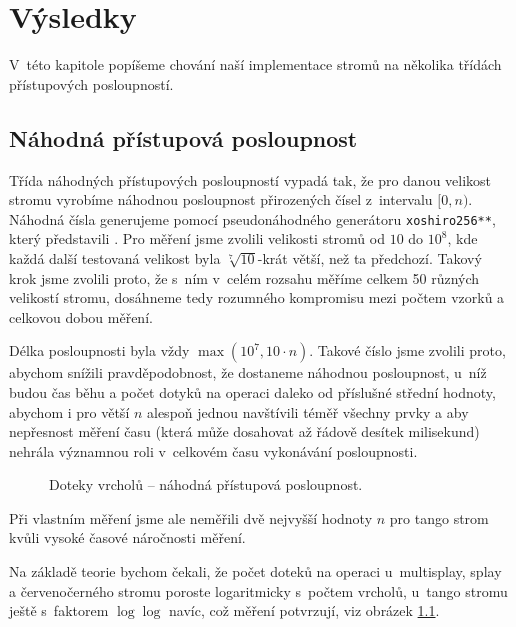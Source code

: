 \chapter{Výsledky}

V~této kapitole popíšeme chování naší implementace stromů na několika třídách přístupových posloupností.

\section{Náhodná přístupová posloupnost}

Třída náhodných přístupových posloupností vypadá tak, že pro danou velikost
stromu vyrobíme náhodnou posloupnost přirozených čísel z~intervalu $[0,n)$.
Náhodná čísla generujeme pomocí pseudonáhodného generátoru {\tt xoshiro256**},
který představili \citet{xoshiro}. Pro měření jsme zvolili velikosti stromů od $10$ do $
10^8$, kde každá další testovaná velikost byla $\sqrt[7]{10}$-krát větší, než ta předchozí. Takový krok
jsme zvolili proto, že s~ním v~celém rozsahu měříme celkem 50 různých velikostí
stromu, dosáhneme tedy rozumného kompromisu mezi počtem vzorků a celkovou
dobou měření. 

Délka posloupnosti byla vždy $\max(10^7, 10\cdot n)$.
Takové číslo jsme zvolili proto, abychom snížili pravděpodobnost, že dostaneme
náhodnou posloupnost, u~níž budou čas běhu a počet dotyků na operaci daleko od
příslušné střední hodnoty, abychom i pro větší $n$ alespoň jednou navštívili
téměř všechny prvky a aby
nepřesnost měření času (která může dosahovat až řádově desítek milisekund)
nehrála významnou roli v~celkovém času vykonávání posloupnosti. 

\def\graphfigure#1#2{
\begin{figure}[h!]
\centering
\caption{#2}
\label{obr:#1}
\end{figure}
}

\graphfigure{touch_r}{Doteky vrcholů -- náhodná přístupová posloupnost.}


Při vlastním měření jsme ale neměřili dvě nejvyšší hodnoty $n$ pro tango strom kvůli vysoké časové náročnosti měření.

Na základě teorie bychom čekali, že počet doteků na operaci u~multisplay, splay a červenočerného stromu poroste logaritmicky s~počtem vrcholů, u~tango stromu ještě s~faktorem $\log\log$ navíc, což měření potvrzují, viz obrázek \ref{obr:touch_r}.
\let\oldlog\log
\def\log{\oldlog_2}

